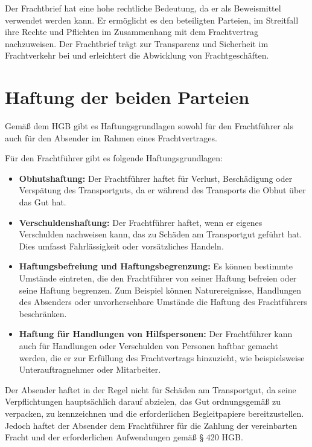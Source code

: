Der Frachtbrief hat eine hohe rechtliche Bedeutung, da er als Beweismittel verwendet werden kann. Er ermöglicht es den beteiligten Parteien, im Streitfall ihre Rechte und Pflichten im Zusammenhang mit dem Frachtvertrag nachzuweisen. Der Frachtbrief trägt zur Transparenz und Sicherheit im Frachtverkehr bei und erleichtert die Abwicklung von Frachtgeschäften.

\section{Haftung der beiden Parteien}
Gemäß dem \ac{HGB} gibt es Haftungsgrundlagen sowohl für den Frachtführer als auch für den Absender im Rahmen eines Frachtvertrages.

Für den Frachtführer gibt es folgende Haftungsgrundlagen:
\begin{itemize}
    \item \textbf{Obhutshaftung:} Der Frachtführer haftet für Verlust, Beschädigung oder Verspätung des Transportguts, da er während des Transports die Obhut über das Gut hat.
    \item \textbf{Verschuldenshaftung:} Der Frachtführer haftet, wenn er eigenes Verschulden nachweisen kann, das zu Schäden am Transportgut geführt hat. Dies umfasst Fahrlässigkeit oder vorsätzliches Handeln.
    \item \textbf{Haftungsbefreiung und Haftungsbegrenzung:} Es können bestimmte Umstände eintreten, die den Frachtführer von seiner Haftung befreien oder seine Haftung begrenzen. Zum Beispiel können Naturereignisse, Handlungen des Absenders oder unvorhersehbare Umstände die Haftung des Frachtführers beschränken.
    \item \textbf{Haftung für Handlungen von Hilfspersonen:} Der Frachtführer kann auch für Handlungen oder Verschulden von Personen haftbar gemacht werden, die er zur Erfüllung des Frachtvertrags hinzuzieht, wie beispielsweise Unterauftragnehmer oder Mitarbeiter.
\end{itemize}

Der Absender haftet in der Regel nicht für Schäden am Transportgut, da seine Verpflichtungen hauptsächlich darauf abzielen, das Gut ordnungsgemäß zu verpacken, zu kennzeichnen und die erforderlichen Begleitpapiere bereitzustellen. Jedoch haftet der Absender dem Frachtführer für die Zahlung der vereinbarten Fracht und der erforderlichen Aufwendungen gemäß § 420 \ac{HGB}.